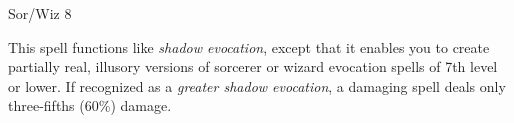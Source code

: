 
\begin{description*}
\item[Level:] Sor/Wiz 8
\end{description*}

This spell functions like \textit{shadow evocation}, except that it enables you
to create partially real, illusory versions of sorcerer or wizard evocation spells
of 7th level or lower. If recognized as a \textit{greater shadow evocation}, a
damaging spell deals only three-fifths (60\%) damage.
